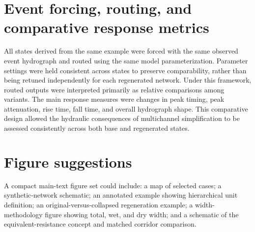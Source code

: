 \documentclass[11pt]{article}
\begin{document}
\section{Event forcing, routing, and comparative response metrics}
All states derived from the same example were forced with the same observed event hydrograph and routed using the same model parameterization. Parameter settings were held consistent across states to preserve comparability, rather than being retuned independently for each regenerated network. Under this framework, routed outputs were interpreted primarily as relative comparisons among variants. The main response measures were changes in peak timing, peak attenuation, rise time, fall time, and overall hydrograph shape. This comparative design allowed the hydraulic consequences of multichannel simplification to be assessed consistently across both base and regenerated states.

\section{Figure suggestions}
A compact main-text figure set could include: a map of selected cases; a synthetic-network schematic; an annotated example showing hierarchical unit definition; an original-versus-collapsed regeneration example; a width-methodology figure showing total, wet, and dry width; and a schematic of the equivalent-resistance concept and matched corridor comparison.
\end{document}
